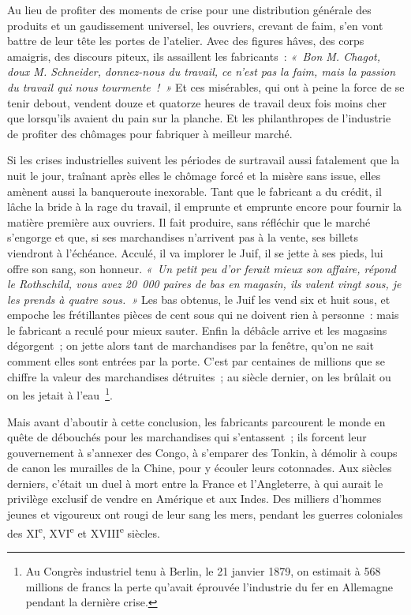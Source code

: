 \documentclass[french,twoside]{book} %
\begin{document}
\noindent Au lieu de profiter des moments de crise pour une distribution générale des produits et un gaudissement universel, les ouvriers, crevant de faim, s’en vont battre de leur tête les portes de l’atelier. Avec des figures hâves, des corps amaigris, des discours piteux, ils assaillent les fabricants : \emph{« Bon M. Chagot, doux M. Schneider, donnez-nous du travail, ce n’est pas la faim, mais la passion du travail qui nous tourmente ! »} Et ces misérables, qui ont à peine la force de se tenir debout, vendent douze et quatorze heures de travail deux fois moins cher que lorsqu’ils avaient du pain sur la planche. Et les philanthropes de l’industrie de profiter des chômages pour fabriquer à meilleur marché.\par
Si les crises industrielles suivent les périodes de surtravail aussi fatalement que la nuit le jour, traînant après elles le chômage forcé et la misère sans issue, elles amènent aussi la banqueroute inexorable. Tant que le fabricant a du crédit, il lâche la bride à la rage du travail, il emprunte et emprunte encore pour fournir la matière première aux ouvriers. Il fait produire, sans réfléchir que le marché s’engorge et que, si ses marchandises n’arrivent pas à la vente, ses billets viendront à l’échéance. Acculé, il va implorer le Juif, il se jette à ses pieds, lui offre son sang, son honneur. \emph{« Un petit peu d’or ferait mieux son affaire, répond le Rothschild, vous avez 20 000 paires de bas en magasin, ils valent vingt sous, je les prends à quatre sous. »} Les bas obtenus, le Juif les vend six et huit sous, et empoche les frétillantes pièces de cent sous qui ne doivent rien à personne : mais le fabricant a reculé pour mieux sauter. Enfin la débâcle arrive et les magasins dégorgent ; on jette alors tant de marchandises par la fenêtre, qu’on ne sait comment elles sont entrées par la porte. C’est par centaines de millions que se chiffre la valeur des marchandises détruites ; au siècle dernier, on les brûlait ou on les jetait à l’eau \footnote{Au Congrès industriel tenu à Berlin, le 21 janvier 1879, on estimait à 568 millions de francs la perte qu’avait éprouvée l’industrie du fer en Allemagne pendant la dernière crise.}.\par
Mais avant d’aboutir à cette conclusion, les fabricants parcourent le monde en quête de débouchés pour les marchandises qui s’entassent ; ils forcent leur gouvernement à s’annexer des Congo, à s’emparer des Tonkin, à démolir à coups de canon les murailles de la Chine, pour y écouler leurs cotonnades. Aux siècles derniers, c’était un duel à mort entre la France et l’Angleterre, à qui aurait le privilège exclusif de vendre en Amérique et aux Indes. Des milliers d’hommes jeunes et vigoureux ont rougi de leur sang les mers, pendant les guerres coloniales des XI\textsuperscript{e}, XVI\textsuperscript{e} et XVIII\textsuperscript{e} siècles.\par
\end{document}

